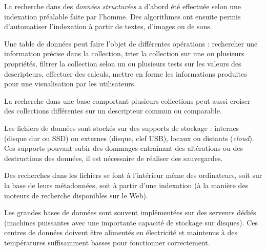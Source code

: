 \begin{tcolorbox}[title={Algorithmes et programmes}, toprule=0pt, leftrule=0pt, rightrule=0pt, arc=0pt,
                  fonttitle=\scshape\boxtitlefont,
                  colbacktitle=white, coltitle=firstcolor, colframe=firstcolor, colback=firstcolor!10,
                  breakable, enhanced jigsaw]
La recherche dans des \emph{données structurées} a d’abord été effectuée selon une indexation préalable faite par l’homme. Des algorithmes ont ensuite permis d’automatiser l’indexation à partir de textes, d’images ou de sons.

Une table de données peut faire l’objet de différentes opérations : rechercher une information précise dans la collection, trier la collection sur une ou plusieurs propriétés, filtrer la collection selon un ou plusieurs tests sur les valeurs des descripteurs, effectuer des calculs, mettre en forme les informations produites pour une visualisation par les utilisateurs.

La recherche dans une base comportant plusieurs collections peut aussi croiser des collections différentes sur un descripteur commun ou comparable.
\end{tcolorbox}

\begin{tcolorbox}[title={}Machines, toprule=0pt, leftrule=0pt, rightrule=0pt, arc=0pt,
                  fonttitle=\scshape\boxtitlefont,
                  colbacktitle=white, coltitle=firstcolor, colframe=firstcolor, colback=firstcolor!10,
                  breakable, enhanced jigsaw]
Les fichiers de données sont stockés sur des supports de stockage : internes (disque dur ou SSD) ou externes (disque, clef USB), locaux ou distants (\textit{cloud}). Ces supports pouvant subir des dommages entraînant des altérations ou des destructions des données, il est nécessaire de réaliser des sauvegardes.

Des recherches dans les fichiers se font à l’intérieur même des ordinateurs, soit sur la base de leurs métadonnées, soit à partir d’une indexation (à la manière des moteurs de recherche disponibles sur le Web).

Les grandes bases de données sont souvent implémentées sur des serveurs dédiés (machines puissantes avec une importante capacité de stockage sur disques). Ces centres de données doivent être alimentés en électricité et maintenus à des températures suffisamment basses pour fonctionner correctement.
\end{tcolorbox}


